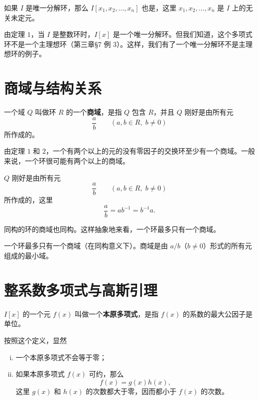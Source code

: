 \begin{theorem}
如果 $I$ 是唯一分解环，那么 $I[x_1,x_2,\ldots,x_n]$ 也是，这里 $x_1,x_2,\ldots,x_n$ 是 $I$ 上的无关未定元。

由定理 $1$，当 $I$ 是整数环时，$I[x]$ 是一个唯一分解环。但我们知道，这个多项式环不是一个主理想环（第三章§$7$ 例 $3$）。这样，我们有了一个唯一分解环不是主理想环的例子。
\end{theorem}

\section{商域与结构关系}

\begin{definition}[商域]
一个域 $Q$ 叫做环 $R$ 的一个\textbf{商域}，是指 $Q$ 包含 $R$，并且 $Q$ 刚好是由所有元
\[
\frac{a}{b}\qquad(a,b\in R,\;b\ne 0)
\]
所作成的。

由定理 $1$ 和 $2$，一个有两个以上的元的没有零因子的交换环至少有一个商域。一般来说，一个环很可能有两个以上的商域。
\end{definition}

\begin{theorem}[定理 2：商域的元素结构]
$Q$ 刚好是由所有元
\[
\frac{a}{b}\qquad(a,b\in R,\;b\ne 0)
\]
所作成的，这里
\[
\frac{a}{b}=ab^{-1}=b^{-1}a.
\]
\end{theorem}

\begin{theorem}[定理 4：同构的环商域也同构]
同构的环的商域也同构。这样抽象地来看，一个环最多只有一个商域。
\end{theorem}

\begin{note}[商域的唯一性]
一个环最多只有一个商域（在同构意义下）。商域是由 $a/b$（$b\neq0$）形式的所有元组成的最小域。
\end{note}

\section{整系数多项式与高斯引理}

\begin{definition}[本原多项式]
$I[x]$ 的一个元 $f(x)$ 叫做一个\textbf{本原多项式}，是指 $f(x)$ 的系数的最大公因子是单位。

按照这个定义，显然
\begin{enumerate}[(ii)]
  \item 一个本原多项式不会等于零；
  \item[(iii)] 如果本原多项式 $f(x)$ 可约，那么
  \[
    f(x)=g(x)h(x),
  \]
  这里 $g(x)$ 和 $h(x)$ 的次数都大于零，因而都小于 $f(x)$ 的次数。
\end{enumerate}
\end{definition}

